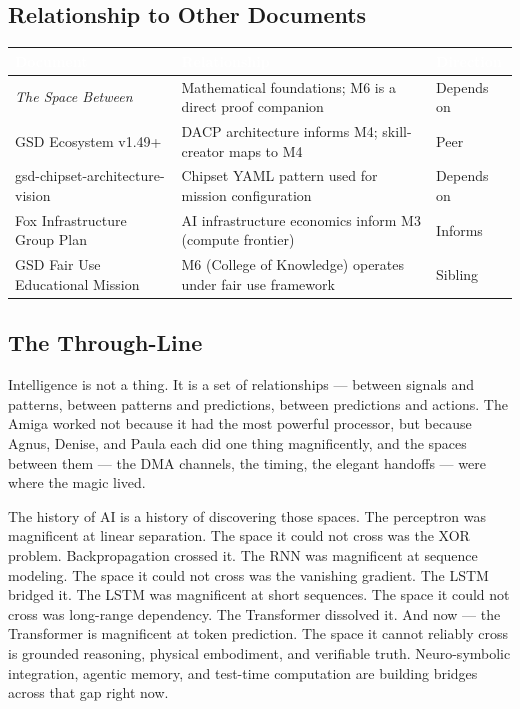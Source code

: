 \documentclass[11pt,letterpaper]{article}
\newcommand{\tableheader}[1]{\textbf{\sffamily\textcolor{white}{#1}}}
\begin{document}
\subsection{Relationship to Other Documents}

\begin{center}
\begin{tabularx}{\textwidth}{L{4cm}XC{2cm}}
\toprule
{}
\tableheader{Document} & \tableheader{Relationship} & \tableheader{Direction} \\
\midrule
\textit{The Space Between} & Mathematical foundations; M6 is a direct proof companion & Depends on \\
GSD Ecosystem v1.49+ & DACP architecture informs M4; skill-creator maps to M4 & Peer \\
gsd-chipset-architecture-vision & Chipset YAML pattern used for mission configuration & Depends on \\
Fox Infrastructure Group Plan & AI infrastructure economics inform M3 (compute frontier) & Informs \\
GSD Fair Use Educational Mission & M6 (College of Knowledge) operates under fair use framework & Sibling \\
\bottomrule
\end{tabularx}
\end{center}

\subsection{The Through-Line}

Intelligence is not a thing. It is a set of relationships — between signals and patterns, between patterns and predictions, between predictions and actions. The Amiga worked not because it had the most powerful processor, but because Agnus, Denise, and Paula each did one thing magnificently, and the spaces between them — the DMA channels, the timing, the elegant handoffs — were where the magic lived.

The history of AI is a history of discovering those spaces. The perceptron was magnificent at linear separation. The space it could not cross was the XOR problem. Backpropagation crossed it. The RNN was magnificent at sequence modeling. The space it could not cross was the vanishing gradient. The LSTM bridged it. The LSTM was magnificent at short sequences. The space it could not cross was long-range dependency. The Transformer dissolved it. And now — the Transformer is magnificent at token prediction. The space it cannot reliably cross is grounded reasoning, physical embodiment, and verifiable truth. Neuro-symbolic integration, agentic memory, and test-time computation are building bridges across that gap right now.
\end{document}
